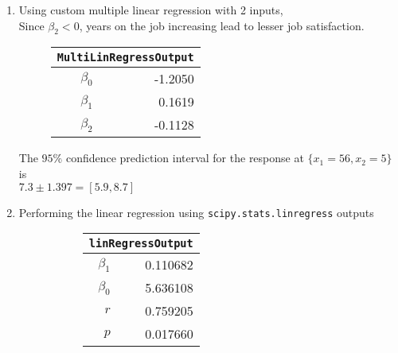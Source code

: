 \begin{enumerate}
\item Using custom multiple linear regression with 2 inputs, \\
Since $ \beta_2  < 0$, years on the job increasing lead to lesser job satisfaction.\\

\begin{figure}[H]
	\centering
	\begin{tabular}{@{}rr@{}}
		\toprule
		\multicolumn{2}{c}{\texttt{MultiLinRegressOutput}} \\
		\midrule
		$\beta_0$ &          -1.2050 \\
		$\beta_1$ &           0.1619 \\
		$\beta_2$ &          -0.1128 \\
		\bottomrule
	\end{tabular}
	
\end{figure}

The $ 95\% $ confidence prediction interval for the response at $ \{x_1 = 56, x_2 = 5\} $ is \\
$ 7.3 \pm 1.397 = [5.9, 8.7]$ \\

\item Performing the linear regression using \texttt{scipy.stats.linregress} outputs \\

\begin{figure}[H]
	\begin{subfigure}[]{0.2\linewidth}
		\centering
		\begin{tabular}{@{}rr@{}}
			\toprule
			\multicolumn{2}{c}{\texttt{linRegressOutput}} \\
			\midrule
			$\beta_1$     &         0.110682 \\
			$\beta_0$ &         5.636108 \\
			$r$    &         0.759205 \\
			$p$    &         0.017660 \\
			\bottomrule
		\end{tabular}
		
	\end{subfigure}
	\begin{subfigure}[]{0.8\linewidth}
		\centering
		
	\end{subfigure}
\end{figure}


\end{enumerate}
